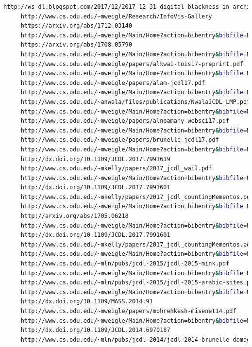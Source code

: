 \documentclass[a4paper, 11pt]{article}
\begin{document}
\begin{lstlisting}[language=bash,label=Output:,caption=Output:]
	 http://ws-dl.blogspot.com/2017/12/2017-12-31-digital-blackness-in-archive.html
	 http://www.cs.odu.edu/~mweigle/Research/InfoVis-Gallery
	 https://arxiv.org/abs/1712.03140
	 http://www.cs.odu.edu/~mweigle/Main/Home?action=bibentry&bibfile=Main.bibtex&bibref=aturban-arxiv17
	 https://arxiv.org/abs/1708.05790
	 http://www.cs.odu.edu/~mweigle/Main/Home?action=bibentry&bibfile=Main.bibtex&bibref=mccoy-arxiv17
	 http://www.cs.odu.edu/~mweigle/papers/alkwai-tois17-preprint.pdf
	 http://www.cs.odu.edu/~mweigle/Main/Home?action=bibentry&bibfile=Main.bibtex&bibref=alkwai-tois17
	 http://www.cs.odu.edu/~mweigle/papers/alam-jcdl17.pdf
	 http://www.cs.odu.edu/~mweigle/Main/Home?action=bibentry&bibfile=Main.bibtex&bibref=alam-jcdl17
	 http://www.cs.odu.edu/~anwala/files/publications/NwalaJCDL_LMP.pdf
	 http://www.cs.odu.edu/~mweigle/Main/Home?action=bibentry&bibfile=Main.bibtex&bibref=nwala-jcdl17
	 http://www.cs.odu.edu/~mweigle/papers/alnoamany-websci17.pdf
	 http://www.cs.odu.edu/~mweigle/Main/Home?action=bibentry&bibfile=Main.bibtex&bibref=alnoamany-websci17
	 http://www.cs.odu.edu/~mweigle/papers/brunelle-jcdl17.pdf
	 http://www.cs.odu.edu/~mweigle/Main/Home?action=bibentry&bibfile=Main.bibtex&bibref=brunelle-jcdl17
	 http://dx.doi.org/10.1109/JCDL.2017.7991619
	 http://www.cs.odu.edu/~mkelly/papers/2017_jcdl_wail.pdf
	 http://www.cs.odu.edu/~mweigle/Main/Home?action=bibentry&bibfile=Main.bibtex&bibref=berlin-jcdl17
	 http://dx.doi.org/10.1109/JCDL.2017.7991601
	 http://www.cs.odu.edu/~mkelly/papers/2017_jcdl_countingMementos.pdf
	 http://www.cs.odu.edu/~mweigle/Main/Home?action=bibentry&bibfile=Main.bibtex&bibref=kelly-jcdl17
	 http://arxiv.org/abs/1705.06218
	 http://www.cs.odu.edu/~mweigle/Main/Home?action=bibentry&bibfile=Main.bibtex&bibref=alnoamany-arxiv17
	 http://dx.doi.org/10.1109/JCDL.2017.7991601
	 http://www.cs.odu.edu/~mkelly/papers/2017_jcdl_countingMementos.pdf
	 http://www.cs.odu.edu/~mweigle/Main/Home?action=bibentry&bibfile=Main.bibtex&bibref=kelly-jcdl17
	 http://www.cs.odu.edu/~mln/pubs/jcdl-2015/jcdl-2015-mink.pdf
	 http://www.cs.odu.edu/~mweigle/Main/Home?action=bibentry&bibfile=Main.bibtex&bibref=jordan-jcdl15
	 http://www.cs.odu.edu/~mln/pubs/jcdl-2015/jcdl-2015-arabic-sites.pdf
	 http://www.cs.odu.edu/~mweigle/Main/Home?action=bibentry&bibfile=Main.bibtex&bibref=alkwai-jcdl15
	 http://dx.doi.org/10.1109/MASS.2014.91
	 http://www.cs.odu.edu/~mweigle/papers/mohrehkesh-misenet14.pdf
	 http://www.cs.odu.edu/~mweigle/Main/Home?action=bibentry&bibfile=Main.bibtex&bibref=mohrehkesh-misenet14
	 http://dx.doi.org/10.1109/JCDL.2014.6970187
	 http://www.cs.odu.edu/~mln/pubs/jcdl-2014/jcdl-2014-brunelle-damage.pdf

\end{lstlisting}
\end{document}
